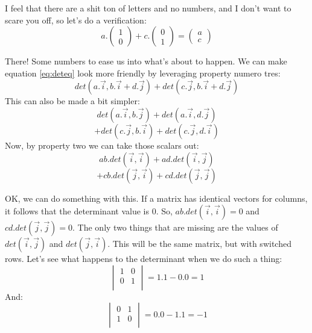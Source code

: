 \documentclass[600paper, 11pt,twoside,openany]{kdp}
\begin{document}
\vspace{-3pt}
\indent I feel that there are a shit ton of letters and no numbers, and I don’t want to scare you off, so let’s do a verification:
\[a.\begin{pmatrix}
1\\
0
\end{pmatrix} + c.\begin{pmatrix}
0\\
1
\end{pmatrix} = \begin{pmatrix}
a\\
c
\end{pmatrix}\]
\par 
\vspace{-3pt}
\indent There! Some numbers to ease us into what’s about to happen. We can make equation \ref{eq:deteq} look more friendly by leveraging property numero tres:
\[det(a.\overrightarrow{i}, b.\overrightarrow{i} + d.\overrightarrow{j}) + det(c.\overrightarrow{j}, b.\overrightarrow{i} + d.\overrightarrow{j}) \]
\indent This can also be made a bit simpler:
\[det(a.\overrightarrow{i}, b.\overrightarrow{j} ) +
  det(a.\overrightarrow{i}, d.\overrightarrow{j} )\] 
  \[+ det(c.\overrightarrow{j}, b.\overrightarrow{i} ) +
  det(c.\overrightarrow{j}, d.\overrightarrow{i} ) 
\]
\indent Now, by property two we can take those scalars out:
\begin{equation}\label{eq:detS}
ab.det(\overrightarrow{i}, \overrightarrow{i}) + ad.det(\overrightarrow{i},\overrightarrow{j}) 
\end{equation}
\[+ cb.det(\overrightarrow{j},\overrightarrow{i}) + cd.det(\overrightarrow{j},\overrightarrow{j})\]
\par 
\vspace{-3pt}
\indent OK, we can do something with this. If a matrix has identical vectors for columns, it follows that the determinant value is 0. So,  $ab.det(\overrightarrow{i}, \overrightarrow{i}) = 0$ and $cd.det(\overrightarrow{j},\overrightarrow{j}) = 0$. The only two things that are missing are the values of $det(\overrightarrow{i},\overrightarrow{j})$ and $det(\overrightarrow{j},\overrightarrow{i})$. This will be the same matrix, but with switched rows. Let’s see what happens to the determinant when we do such a thing:
\[ \begin{vmatrix}
1 & 0\\
0 & 1\\
\end{vmatrix} = 1.1 -0.0 = 1
\]
\indent And:
\[ \begin{vmatrix}
0 & 1\\
1 & 0\\
\end{vmatrix} = 0.0 - 1.1 = -1
\]
\end{document}
